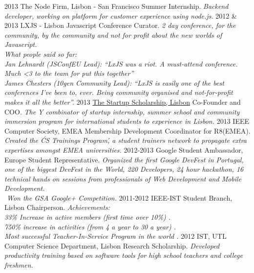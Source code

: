 \documentclass[]{friggeri-cv}
\begin{document}
\begin{entrylist}
  \entry
    {2013}
    {The Node Firm, Lisbon - San Francisco}
    {Summer Internship.}
    {\emph{Backend developer, working on platform for customer experience using node.js.}}
  \entry
    {2012 \& 2013}
    {LXJS - Lisbon Javascript Conference}
    {Curator.}
    {\emph{2 day conference, for the community, by the community and not for profit about the new worlds of Javascript. \\
    What people said so far:  \\
      Jan Lehnardt (JSConfEU Lead): “LxJS was a riot. A must-attend conference. Much <3 to the team for put this together”  \\
      James Chesters (10gen Community Lead): “LxJS is easily one of the best conferences I’ve been to, ever. Being community  organised and not-for-profit makes it all the better”.}}
  \entry
    {2013}
    {\href{http://startupscholarship.org/}{The Startup Scholarship, Lisbon}}
    {Co-Founder and COO.}
    {\emph{The Y combinator of startup internship, summer school and community immersion program for international students to experience in Lisbon.}}
  \entry
    {2013}
    {IEEE Computer Society, EMEA}
    {Membership Development Coordinator for R8(EMEA).}
    {\emph{Created the \'CS Trainings Program\', a student trainers network to propagate extra expertises amongst EMEA universities.}}    
  \entry
    {2012-2013}
    {Google Student Ambassador, Europe}
    {Student Representative.}
    {\emph{Organized the first Google DevFest in Portugal, one of the biggest DevFest in the World, 220 Developers, 24 hour hackathon, 16 technical hands on sessions from professionals of Web Development and Mobile Development. \\
     Won the GSA Google+ Competition.}}
  \entry
    {2011-2012}
    {IEEE-IST Student Branch, Lisbon}
    {Chairperson.}
    {\emph{Achievements:  \\
      33\% Increase in active members (first time over 10\%) . \\
      750\% increase in activities (from 4 a year to 30 a year) . \\
      Most successful Teacher-In-Service Program in the world .}}      
  \entry
    {2012}
    {IST, UTL Computer Science Department, Lisbon}
    {Research Scholarship.}
    {\emph{Developed productivity training based on software tools for high school teachers and college freshmen.}}
\end{entrylist}
\end{document}
